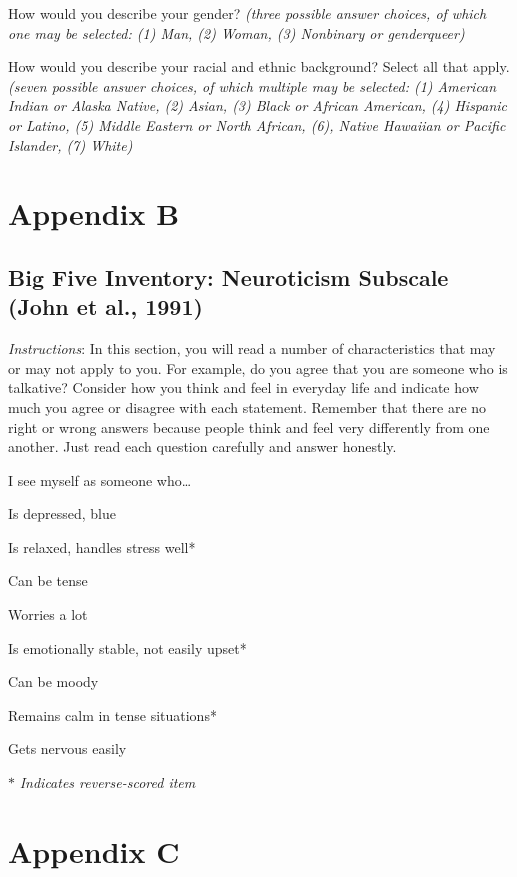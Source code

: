 \documentclass[
  english,
  man]{apa6}
\begin{document}
How would you describe your gender? \emph{(three possible answer choices, of which one may be selected: (1) Man, (2) Woman, (3) Nonbinary or genderqueer)}

How would you describe your racial and ethnic background? Select all that apply. \emph{(seven possible answer choices, of which multiple may be selected: (1) American Indian or Alaska Native, (2) Asian, (3) Black or African American, (4) Hispanic or Latino, (5) Middle Eastern or North African, (6), Native Hawaiian or Pacific Islander, (7) White)}

\newpage

\section{Appendix B}\label{appendix-b}

\subsection{Big Five Inventory: Neuroticism Subscale (John et al., 1991)}\label{big-five-inventory-neuroticism-subscale-john-et-al.-1991}

\emph{Instructions}: In this section, you will read a number of characteristics that may or may not apply to you. For example, do you agree that you are someone who is talkative? Consider how you think and feel in everyday life and indicate how much you agree or disagree with each statement. Remember that there are no right or wrong answers because people think and feel very differently from one another. Just read each question carefully and answer honestly.

I see myself as someone who\ldots{}

Is depressed, blue

Is relaxed, handles stress well*

Can be tense

Worries a lot

Is emotionally stable, not easily upset*

Can be moody

Remains calm in tense situations*

Gets nervous easily

\(*\) \emph{Indicates reverse-scored item}

\newpage

\section{Appendix C}\label{appendix-c}
\end{document}

